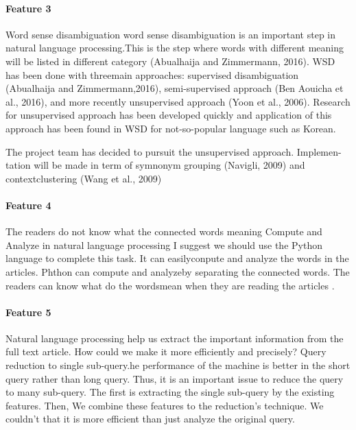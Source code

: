 \documentclass[a4paper]{article} %
\begin{document}
	\paragraph*{Feature 3 }
	\label{task1:feature3}
	Word sense disambiguation
	word sense disambiguation is an important step in natural language processing.This is the step where words with different meaning will be listed in different category (Abualhaija and Zimmermann, 2016). WSD has been done with threemain approaches: supervised disambiguation (Abualhaija  and  Zimmermann,2016), semi-supervised approach (Ben Aouicha et al., 2016), and more recently unsupervised approach (Yoon et al., 2006). Research for unsupervised approach has been developed quickly and application of this approach has been found in WSD for not-so-popular language such as Korean.
	
	The project team has decided to pursuit the unsupervised approach.  Implemen-tation will be made in term of symnonym grouping (Navigli, 2009) and contextclustering (Wang et al., 2009)
	
	
	\paragraph*{Feature 4 }
	\label{task1:feature4}
	The readers do not know what the connected words meaning
	Compute and Analyze in natural language processing
	I suggest we should use the Python language to complete this task.  It can easilyconpute and analyze the words in the articles.  Phthon can compute and analyzeby separating the connected words.  The readers can know what do the wordsmean when they are reading the articles .
	
	
	\paragraph*{Feature 5 }
	\label{task1:feature5}
	Natural language processing help us extract the important information from the full text article. How could we make it more efficiently and precisely?
	Query reduction to single sub-query.he performance of the machine is better in the short query rather than long query. Thus, it is an important issue to reduce the query to many sub-query. The first is extracting the single sub-query by the existing features.  Then, We combine these features to the reduction's technique. We couldn't that it is more efficient than just analyze the original query.
	\clearpage
	
	
	
\end{document}
